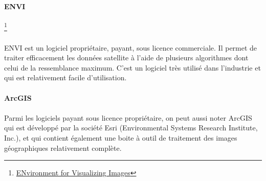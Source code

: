 \documentclass[a4paper,10pt]{report}
\begin{document}
\paragraph{ENVI}\footnote{\href{http://www.exelisvis.fr/ProduitsetServices/LesproduitsENVI/ENVI.aspx}{ENvironment for Visualizing Images}}
\paragraph{}
ENVI est un logiciel propriétaire, payant, sous licence commerciale. Il permet de traiter efficacement les données satellite à l'aide de plusieurs algorithmes dont celui de la ressemblance maximum. C'est un logiciel très utilisé dans l'industrie et qui est relativement facile d'utilisation.
\paragraph{ArcGIS}
\paragraph{}
Parmi les logiciels payant sous licence propriétaire, on peut aussi noter ArcGIS qui est développé par la société Esri (Environmental Systems Research Institute, Inc.), et qui contient également une boite à outil de traitement des images géographiques relativement complète.
\end{document}
